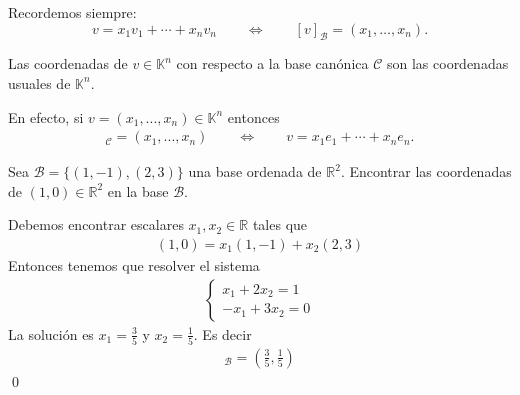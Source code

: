 \documentclass[handout]{beamer} %
\newcommand{\R}{\mathbb R}
\newcommand{\K}{\mathbb K}
\newcommand{\cC}{\mathcal{C}}
\newcommand{\cB}{\mathcal{B}}
\begin{document}
        \begin{frame}
            
        \begin{observacion}
        Recordemos siempre:
        $$
        v =   x_1v_1 + \cdots +x_nv_n \qquad \Longleftrightarrow \qquad 
        [v]_\mathcal{B} = (x_1,\ldots,x_n).
        $$
        \end{observacion}\pause
    
        \begin{ejemplo}
        Las coordenadas de $v\in\K^n$ con respecto a la base canónica $\cC$ son las coordenadas usuales de $\K^n$. 
        \end{ejemplo}\pause
        
        En efecto, si $v=(x_1, ..., x_n)\in\K^n$ entonces
        \begin{align*}
        [v]_\cC=(x_1, ..., x_n) \qquad \Longleftrightarrow \qquad v= x_1e_1+\cdots+x_ne_n.
        \end{align*}
        
    
        
        \end{frame}
        
        \begin{frame}
        
    
        \begin{ejemplo}  Sea $\cB=\{(1,-1), (2,3)\}$  una base ordenada de $\R^2$.
        Encontrar las coordenadas de $(1,0)\in\R^2$ en la base $\cB$.
        \end{ejemplo}\pause
        
        \begin{solucion}\pause
            Debemos encontrar escalares $x_1,x_2\in\R$ tales que
        \begin{align*}
        (1,0)=x_1(1,-1)+x_2(2,3) 
        \end{align*}
        Entonces tenemos que resolver el sistema
        \begin{align*}
        \begin{cases}
        x_1+2x_2=1\\ 
        -x_1+3x_2=0
        \end{cases} 
        \end{align*}
        La solución es $x_1=\frac{3}{5}$ y $x_2=\frac{1}{5}$. Es decir
        \begin{align*}
        [(1,0)]_{\cB}=\left(\frac{3}{5},\frac{1}{5}\right) 
        \end{align*}	\qed
        \end{solucion}
    \end{frame}
    
\end{document}
